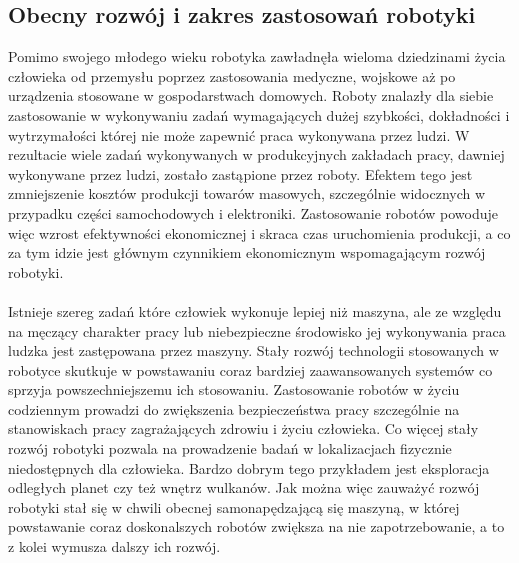 \subsection{Obecny rozwój i zakres zastosowań robotyki}
Pomimo swojego młodego wieku robotyka zawładnęła wieloma dziedzinami życia
człowieka od przemysłu poprzez zastosowania medyczne, wojskowe aż po urządzenia
stosowane w gospodarstwach domowych. Roboty znalazły dla siebie zastosowanie w
wykonywaniu zadań wymagających dużej szybkości, dokładności i wytrzymałości
której nie może zapewnić praca wykonywana przez ludzi. W rezultacie wiele zadań
wykonywanych w produkcyjnych zakładach pracy, dawniej wykonywane przez ludzi,
zostało zastąpione przez roboty. Efektem tego jest zmniejszenie kosztów
produkcji towarów masowych, szczególnie widocznych w przypadku części
samochodowych i elektroniki. Zastosowanie robotów powoduje więc wzrost
efektywności ekonomicznej i skraca czas uruchomienia produkcji, a co za tym
idzie jest głównym czynnikiem ekonomicznym wspomagającym rozwój robotyki. \\
\\
Istnieje szereg zadań które człowiek wykonuje lepiej niż maszyna, ale ze względu
na męczący charakter pracy lub niebezpieczne środowisko jej wykonywania praca
ludzka jest zastępowana przez maszyny. Stały rozwój technologii stosowanych w
robotyce skutkuje w powstawaniu coraz bardziej zaawansowanych systemów co sprzyja
powszechniejszemu ich stosowaniu. Zastosowanie robotów w życiu codziennym
prowadzi do zwiększenia bezpieczeństwa pracy szczególnie na stanowiskach pracy
zagrażających zdrowiu i życiu człowieka. Co więcej stały rozwój robotyki pozwala
na prowadzenie badań w lokalizacjach fizycznie niedostępnych dla człowieka.
Bardzo dobrym tego przykładem jest eksploracja odległych planet czy też wnętrz
wulkanów. Jak można więc zauważyć rozwój robotyki stał się w chwili obecnej
samonapędzającą się maszyną, w której powstawanie coraz doskonalszych robotów
zwiększa na nie zapotrzebowanie, a to z kolei wymusza dalszy ich rozwój.
